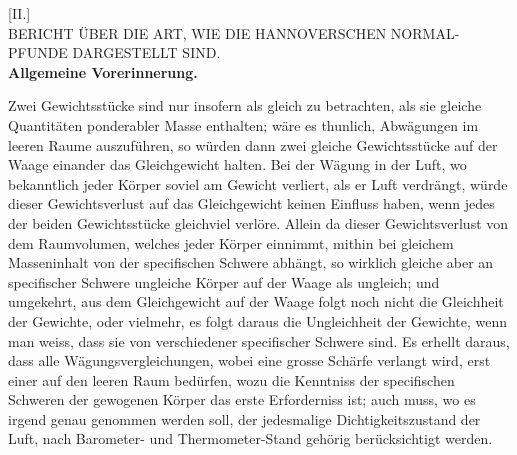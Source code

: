 \clearpage\begingroup\NoSourceHead{}
\begin{center}
[II.]\\[.7em]
BERICHT ÜBER DIE ART, WIE DIE HANNOVERSCHEN NORMAL-\\
PFUNDE DARGESTELLT SIND.\\[1em]
\textbf{Allgemeine Vorerinnerung.}
\end{center}
\noindent\hspace*{\parindent}Zwei Gewichtsstücke sind nur insofern als gleich zu betrachten, als sie
gleiche Quantitäten ponderabler Masse enthalten; wäre es thunlich, Abwägungen
im leeren Raume auszuführen, so würden dann zwei gleiche Gewichtsstücke
auf der Waage einander das Gleichgewicht halten. Bei der
Wägung in der Luft, wo bekanntlich jeder Körper soviel am Gewicht verliert,
als er Luft verdrängt, würde dieser Gewichtsverlust auf das Gleichgewicht
keinen Einfluss haben, wenn jedes der beiden Gewichtsstücke gleichviel verlöre.
Allein da dieser Gewichtsverlust von dem Raumvolumen, welches jeder
Körper einnimmt, mithin bei gleichem Masseninhalt von der specifischen
Schwere abhängt, so  wirklich gleiche aber an specifischer Schwere
ungleiche Körper auf der Waage als ungleich; und umgekehrt, aus dem Gleichgewicht
auf der Waage folgt noch nicht die Gleichheit der Gewichte, oder
vielmehr, es folgt daraus die Ungleichheit der Gewichte, wenn man weiss,
dass sie von verschiedener specifischer Schwere sind. Es erhellt daraus, dass
alle Wägungsvergleichungen, wobei eine grosse Schärfe verlangt wird, erst
einer  auf den leeren Raum bedürfen, wozu die Kenntniss der
specifischen Schweren der gewogenen Körper das erste Erforderniss ist; auch
muss, wo es irgend genau genommen werden soll, der jedesmalige Dichtigkeitszustand
der Luft, nach Barometer- und Thermometer-Stand gehörig berücksichtigt
werden.

